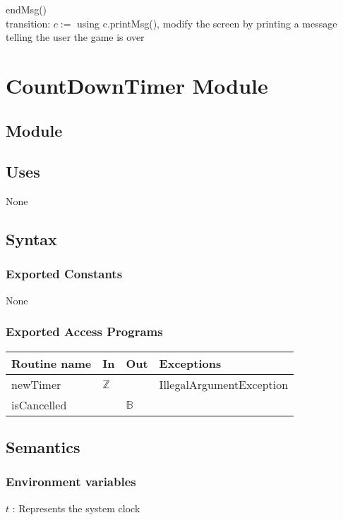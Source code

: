 \documentclass[12pt]{article}
\begin{document}
\noindent endMsg()\\
\noindent transition: $c :=$ using c.printMsg(), modify the screen by printing a message telling the user the game is over


\newpage

\section* {CountDownTimer Module}

\subsection* {Module}


\subsection*{Uses}
None

\subsection* {Syntax}

\subsubsection* {Exported Constants}

None

\subsubsection* {Exported Access Programs}

\begin{tabular}{| l | l | l | p{6cm} |}
\hline
\textbf{Routine name} & \textbf{In} & \textbf{Out} & \textbf{Exceptions}\\
\hline
newTimer & $\mathbb{Z}$ & & IllegalArgumentException \\
\hline
isCancelled &  & $\mathbb{B}$ & \\
\hline
\end{tabular}

\subsection* {Semantics}

\subsubsection* {Environment variables}
\noindent $t$ : Represents the system clock\\
\end{document}
